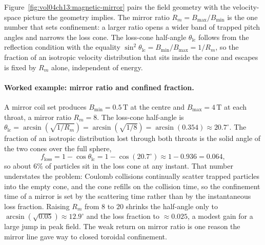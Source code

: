 

Figure~\ref{fig:vol04ch13:magnetic-mirror} pairs the field geometry with
the velocity-space picture the geometry implies. The mirror ratio $R_m =
B_{\max}/B_{\min}$ is the one number that sets confinement: a larger ratio
opens a wider band of trapped pitch angles and narrows the loss cone. The
loss-cone half-angle $\theta_{\mathrm{lc}}$ follows from the reflection
condition with the equality $\sin^{2}\theta_{\mathrm{lc}} = B_{\min}/
B_{\max} = 1/R_m$, so the fraction of an isotropic velocity distribution
that sits inside the cone and escapes is fixed by $R_m$ alone, independent
of energy.

\paragraph{Worked example: mirror ratio and confined fraction.}
A mirror coil set produces $B_{\min} = 0.5\,\si{\tesla}$ at the centre and
$B_{\max} = 4\,\si{\tesla}$ at each throat, a mirror ratio $R_m = 8$. The
loss-cone half-angle is $\theta_{\mathrm{lc}} = \arcsin(\sqrt{1/R_m}) =
\arcsin(\sqrt{1/8}) = \arcsin(0.354) \approx 20.7^{\circ}$. The fraction of
an isotropic distribution lost through both throats is the solid angle of
the two cones over the full sphere,
\[
f_{\mathrm{loss}} = 1 - \cos\theta_{\mathrm{lc}}
= 1 - \cos(20.7^{\circ}) \approx 1 - 0.936 = 0.064,
\]
so about $6\%$ of particles sit in the loss cone at any instant. That number
understates the problem: Coulomb collisions continually scatter trapped
particles into the empty cone, and the cone refills on the collision time,
so the confinement time of a mirror is set by the scattering time rather
than by the instantaneous loss fraction. Raising $R_m$ from $8$ to $20$
shrinks the half-angle only to $\arcsin(\sqrt{0.05}) \approx 12.9^{\circ}$
and the loss fraction to $\approx 0.025$, a modest gain for a large jump in
peak field. The weak return on mirror ratio is one reason the mirror line
gave way to closed toroidal confinement.

